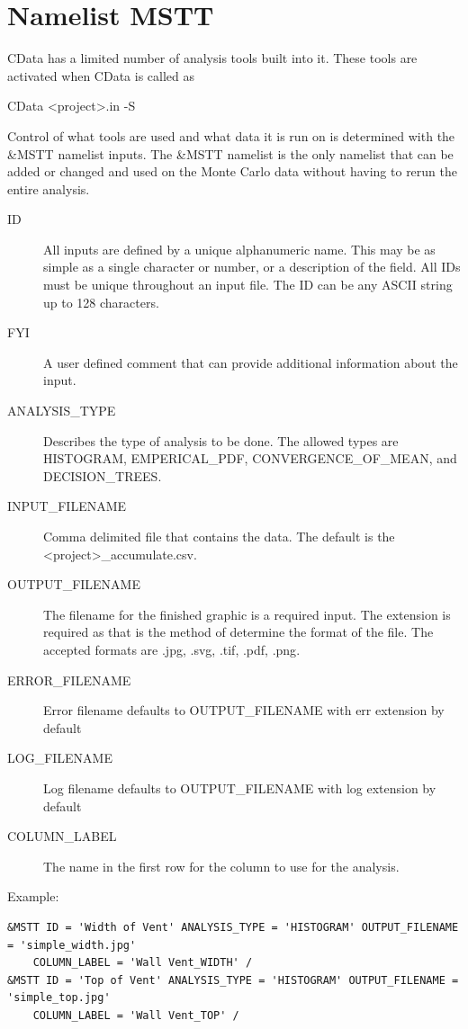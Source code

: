 \documentclass[12pt,twoside]{book}
\begin{document}
\section{Namelist MSTT}
\label{info:MSTT}

CData has a limited number of analysis tools built into it. These tools are activated when CData is called as

{\ct CData <project>.in -S}

Control of what tools are used and what data it is run on is determined with the {\ct \&MSTT} namelist inputs. The {\ct \&MSTT} namelist is the only namelist that can be added or changed and used on the Monte Carlo data without having to rerun the entire analysis.


\begin{description}
 \item[ID] All inputs are defined by a unique alphanumeric name. This may be as simple as a single character or number, or a description of the field. All IDs must be unique throughout an input file. The { \ct ID} can be any ASCII string up to 128 characters.
  \item[FYI] A user defined comment that can provide additional information about the input.
 \item[ANALYSIS\_TYPE] Describes the type of analysis to be done. The allowed types are {\ct HISTOGRAM}, {\ct EMPERICAL\_PDF}, {\ct CONVERGENCE\_OF\_MEAN}, and {\ct DECISION\_TREES}.
 \item[INPUT\_FILENAME] Comma delimited file that contains the data. The default is the \\
     {\ct <project>\_accumulate.csv}.
 \item[OUTPUT\_FILENAME] The filename for the finished graphic is a required input. The extension is required as that is the method of determine the format of the file. The accepted formats are {\ct *.jpg}, {\ct *.svg}, {\ct *.tif}, {\ct *.pdf}, {\ct *.png}.
 \item[ERROR\_FILENAME] Error filename defaults to {\ct OUTPUT\_FILENAME} with {\ct err} extension by default
 \item[LOG\_FILENAME] Log filename defaults to {\ct OUTPUT\_FILENAME} with {\ct log} extension by default
 \item[COLUMN\_LABEL] The name in the first row for the column to use for the analysis.
\end{description}

\vspace{\baselineskip}
\noindent Example:
\begin{lstlisting}[language=cdata, basicstyle=\scriptsize]
&MSTT ID = 'Width of Vent' ANALYSIS_TYPE = 'HISTOGRAM' OUTPUT_FILENAME = 'simple_width.jpg'
	COLUMN_LABEL = 'Wall Vent_WIDTH' /
&MSTT ID = 'Top of Vent' ANALYSIS_TYPE = 'HISTOGRAM' OUTPUT_FILENAME = 'simple_top.jpg'
	COLUMN_LABEL = 'Wall Vent_TOP' /
\end{lstlisting}
\end{document}
